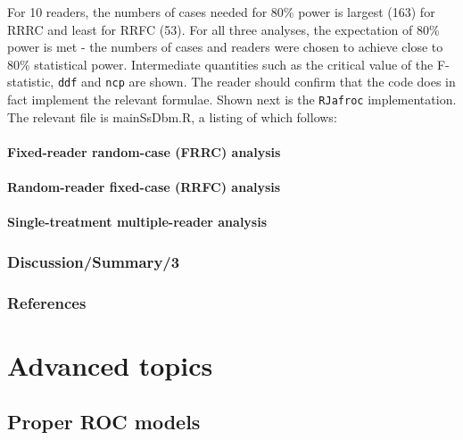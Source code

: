 \documentclass[
]{book}
\begin{document}
For 10 readers, the numbers of cases needed for 80\% power is largest (163) for RRRC and least for RRFC (53). For all three analyses, the expectation of 80\% power is met - the numbers of cases and readers were chosen to achieve close to 80\% statistical power. Intermediate quantities such as the critical value of the F-statistic, \texttt{ddf} and \texttt{ncp} are shown. The reader should confirm that the code does in fact implement the relevant formulae. Shown next is the \texttt{RJafroc} implementation. The relevant file is mainSsDbm.R, a listing of which follows:

\hypertarget{roc-sample-size-or-FRRCAnalysis}{%
\subsection{Fixed-reader random-case (FRRC) analysis}\label{roc-sample-size-or-FRRCAnalysis}}

\hypertarget{roc-sample-size-or-RRFCAnalysis}{%
\subsection{Random-reader fixed-case (RRFC) analysis}\label{roc-sample-size-or-RRFCAnalysis}}

\hypertarget{roc-sample-size-or-STMRAnalysis}{%
\subsection{Single-treatment multiple-reader analysis}\label{roc-sample-size-or-STMRAnalysis}}

\hypertarget{discussionsummary3}{%
\section{Discussion/Summary/3}\label{discussionsummary3}}

\hypertarget{roc-sample-size-or-references}{%
\section{References}\label{roc-sample-size-or-references}}

\hypertarget{part-advanced-topics}{%
\part*{Advanced topics}\label{part-advanced-topics}}

\hypertarget{proper-roc-models}{%
\chapter{Proper ROC models}\label{proper-roc-models}}
\end{document}
